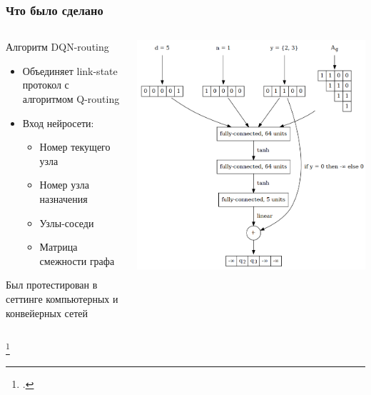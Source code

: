 \documentclass{beamer}
\begin{document}

\begin{frame}
  \frametitle{Что было сделано}
  \begin{columns}
    \begin{column}{0.5\textwidth}
      Алгоритм DQN-routing\footnotemark
      \begin{itemize}
      \item Объединяет link-state протокол с алгоритмом Q-routing
      \item Вход нейросети:
        \begin{itemize}
        \item Номер текущего узла
        \item Номер узла назначения
        \item Узлы-соседи
        \item Матрица смежности графа
        \end{itemize}
      \end{itemize}
      Был протестирован в сеттинге компьютерных и конвейерных сетей
    \end{column}
    \begin{column}{0.5\textwidth}
      \begin{center}
        \includegraphics[width=\textwidth]{nn-2}
      \end{center}
    \end{column}
  \end{columns}
  \footcitetext{mukhutdinov2019multi}
\end{frame}
\end{document}
